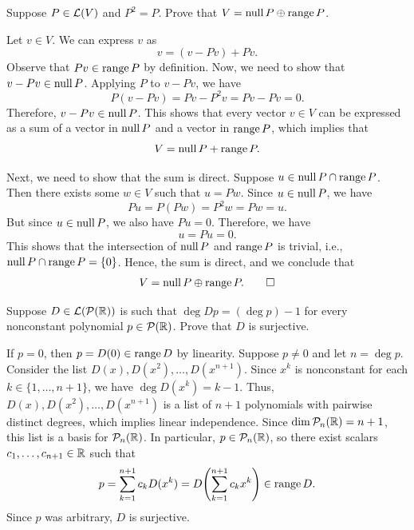 \begin{exc}
\begin{exercise}
Suppose $P\in\mathcal{L}(V)$ and $P^2=P$. Prove that $V=\operatorname{null} P\oplus\operatorname{range} P$.
\end{exercise}
\begin{solution}
Let $v\in V$. We can express $v$ as
\[ v=(v-Pv)+Pv. \]
Observe that $Pv\in\operatorname{range} P$ by definition. Now, we need to show that
$v-Pv\in\operatorname{null} P$. Applying $P$ to $v-Pv$, we have
\[ P(v-Pv)=Pv-P^2v=Pv-Pv=0. \]
Therefore, $v-Pv\in\operatorname{null} P$. This shows that every vector $v\in V$ can be
expressed as a sum of a vector in $\operatorname{null} P$ and a vector in $\operatorname{range} P$, which
implies that
\[ V=\operatorname{null} P+\operatorname{range} P. \]

Next, we need to show that the sum is direct. Suppose
$u\in\operatorname{null} P\cap\operatorname{range} P$. Then there exists some $w\in V$ such that $u=Pw$.
Since $u\in\operatorname{null} P$, we have
\[ Pu=P(Pw)=P^2w=Pw=u. \]
But since $u\in\operatorname{null} P$, we also have $Pu=0$. Therefore, we have
\[ u=Pu=0. \]
This shows that the intersection of $\operatorname{null} P$ and $\operatorname{range} P$ is trivial, i.e.,
$\operatorname{null} P\cap\operatorname{range} P=\{0\}$. Hence, the sum is direct, and we conclude that
\[ V=\operatorname{null} P\oplus\operatorname{range} P. \qedhere \]
\end{solution}

\begin{exercise}
Suppose $D\in\mathcal{L}(\mathcal{P}(\mathbb{R}))$ is such that $\deg Dp=(\deg p)-1$ for every
nonconstant polynomial $p\in\mathcal{P}(\mathbb{R})$. Prove that $D$ is surjective.
\end{exercise}
\begin{solution}

If $p=0$, then $p=D(0)\in\operatorname{range} D$ by linearity. Suppose $p\ne0$ and let
$n=\deg p$. Consider the list $D(x),D(x^2),\dots,D(x^{n+1})$. Since $x^k$ is
nonconstant for each $k\in\{1,\dots,n+1\}$, we have $\deg D(x^k)=k-1$. Thus,
$D(x),D(x^2),\dots,D(x^{n+1})$ is a list of $n+1$ polynomials with pairwise
distinct degrees, which implies linear independence. Since
$\operatorname{dim}\mathcal{P}_n(\mathbb{R})=n+1$, this list is a basis for $\mathcal{P}_n(\mathbb{R})$. In particular,
$p\in\mathcal{P}_n(\mathbb{R})$, so there exist scalars $c_1,\dots,c_{n+1}\in\mathbb{R}$ such that
\[ p=\sum_{k=1}^{n+1}c_kD(x^k)=D\Biggl(\sum_{k=1}^{n+1}c_kx^k\Biggr)\in\operatorname{range} D. \]
Since $p$ was arbitrary, $D$ is surjective.
\end{solution}


\end{exc}

